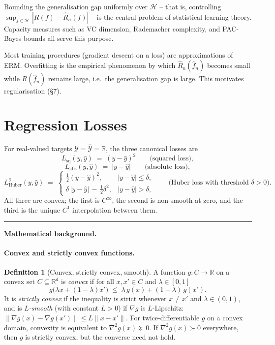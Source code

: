 \documentclass[11pt]{article}
\theoremstyle{definition}
\newtheorem{definition}{Definition}
\begin{document}
\begin{mathnote}
Bounding the generalisation gap uniformly over $\mathcal{H}$ -- that is,
controlling $\sup_{f \in \mathcal{H}} |R(f) - \widehat{R}_n(f)|$ -- is the
central problem of statistical learning theory. Capacity measures such as
VC dimension, Rademacher complexity, and PAC-Bayes bounds all serve this
purpose.
\end{mathnote}

\begin{mlnote}
Most training procedures (gradient descent on a loss) are approximations of
ERM. Overfitting is the empirical phenomenon by which
$\widehat{R}_n(\widehat{f}_n)$ becomes small while $R(\widehat{f}_n)$
remains large, i.e.\ the generalisation gap is large. This motivates
regularisation (\S 7).
\end{mlnote}

\section{Regression Losses}

For real-valued targets $\mathcal{Y} = \widehat{\mathcal{Y}} = \mathbb{R}$,
the three canonical losses are
\[
  L_{\mathrm{sq}}(y, \hat y) \;=\; (y - \hat y)^{2}
  \qquad \text{(squared loss)},
\]
\[
  L_{\mathrm{abs}}(y, \hat y) \;=\; |y - \hat y|
  \qquad \text{(absolute loss)},
\]
\[
  L_{\mathrm{Huber}}^{\delta}(y, \hat y) \;=\;
  \begin{cases}
    \tfrac{1}{2}(y - \hat y)^{2}, & |y - \hat y| \leq \delta,\\[2pt]
    \delta\,|y - \hat y| \,-\, \tfrac{1}{2}\delta^{2}, & |y - \hat y| > \delta,
  \end{cases}
  \qquad \text{(Huber loss with threshold } \delta > 0\text{)}.
\]
All three are convex; the first is $C^{\infty}$, the second is non-smooth
at zero, and the third is the unique $C^{1}$ interpolation between them.

\bigskip
\hrule
\bigskip

\noindent\textbf{Mathematical background.}

\paragraph{Convex and strictly convex functions.}

\begin{definition}[Convex, strictly convex, smooth]
A function $g : C \to \mathbb{R}$ on a convex set $C \subseteq \mathbb{R}^{d}$
is \emph{convex} if for all $x, x' \in C$ and $\lambda \in [0, 1]$
\[
  g\bigl(\lambda x + (1 - \lambda) x'\bigr)
  \;\leq\; \lambda\, g(x) + (1 - \lambda)\, g(x').
\]
It is \emph{strictly convex} if the inequality is strict whenever $x \neq x'$
and $\lambda \in (0, 1)$, and is \emph{$L$-smooth} (with constant $L > 0$) if
$\nabla g$ is $L$-Lipschitz: $\|\nabla g(x) - \nabla g(x')\| \leq L \|x - x'\|$.
For twice-differentiable $g$ on a convex domain, convexity is equivalent to 
$\nabla^2 g(x)\succeq 0$. If $\nabla^2 g(x)\succ 0$ everywhere, then $g$ is strictly convex, but the converse need not hold.
\end{definition}
\end{document}

